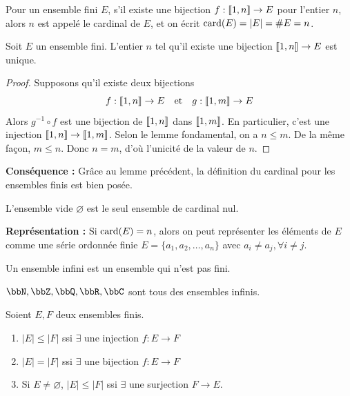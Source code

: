 \begin{deff}
    Pour un ensemble fini $E$,
    s'il existe une bijection $f: \llbracket 1, n \rrbracket \to E$ pour l'entier $n$,
    alors $n$ est appelé le cardinal de $E$, et on écrit $\operatorname{card}(E) = |E| = \#E = n$.
\end{deff}

\begin{lem}
    Soit $E$ un ensemble fini. L'entier $n$ tel qu'il existe une bijection $\llbracket 1, n \rrbracket \to E$ est unique.
\end{lem}

\begin{proof}
    Supposons qu'il existe deux bijections
    \[ f: \llbracket 1, n \rrbracket \to E \quad \text{et} \quad g: \llbracket 1, m \rrbracket \to E \]
    Alors $g^{-1} \circ f$ est une bijection de $\llbracket 1, n \rrbracket$ dans $\llbracket 1, m \rrbracket$.
    En particulier, c'est une injection $\llbracket 1, n \rrbracket \to \llbracket 1, m \rrbracket$.
    Selon le lemme fondamental, on a $n \leqslant m$.
    De la même façon, $m \leqslant n$.
    Donc $n = m$, d'où l'unicité de la valeur de $n$. \qedhere
\end{proof}

\textbf{Conséquence :} Grâce au lemme précédent, la définition du cardinal pour les ensembles finis est bien posée.

\begin{rqq}
    L'ensemble vide $\varnothing$ est le seul ensemble de cardinal nul.
\end{rqq}

\textbf{Représentation :} Si $\operatorname{card}(E) = n$, alors on peut représenter les éléments de $E$ comme une série ordonnée finie
$E = \{ a_1, a_2, \ldots, a_n \}$ avec $a_i \neq a_j, \forall i \neq j$.

\begin{deff}
    Un ensemble infini est un ensemble qui n'est pas fini.
\end{deff}

\begin{exem}
    $\bbN, \bbZ, \bbQ, \bbR, \bbC$ sont tous des ensembles infinis.
\end{exem}

\begin{thm}[comparaison]
    Soient $E, F$ deux ensembles finis.
    \begin{enumerate}
        \item $|E| \leqslant |F|$ ssi $\exists$ une injection $f: E \to F$
        \item $|E| = |F|$ ssi $\exists$ une bijection $f: E \to F$
        \item Si $E \neq \varnothing$, $|E| \leqslant |F|$ ssi $\exists$ une surjection $F \to E$.
    \end{enumerate}
\end{thm}

